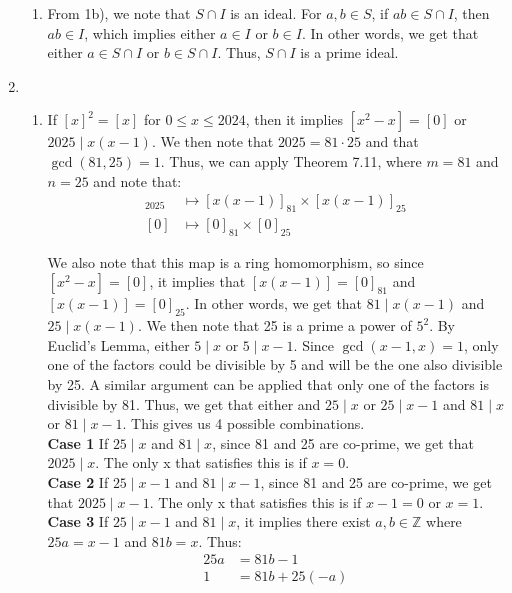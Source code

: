\documentclass{article}
\begin{document}
\begin{enumerate}
\begin{enumerate}
    \item
    From 1b), we note that $S \cap I$ is an ideal. For $a, b \in S$, if $ab \in S \cap I$, then $ab \in I$, which implies either $a \in I$ or $b \in I$. In other words, we get that either $a \in S \cap I$ or $b \in S \cap I$. Thus, $S \cap I$ is a prime ideal.
\end{enumerate}

\newpage 

\item
\begin{enumerate}
    \item 
    If $[x]^2 = [x]$ for $0 \leq x \leq 2024$, then it implies $[x^2 - x] = [0]$ or $2025 \mid x(x-1)$. We then note that $2025 = 81 \cdot 25$ and that $\gcd(81, 25) = 1$. Thus, we can apply Theorem 7.11, where $m = 81$ and $n = 25$ and note that: 
    \begin{align*}
        [x(x-1)]_{2025} &\mapsto [x(x-1)]_{81} \times [x(x-1)]_{25}\\
        [0] &\mapsto [0]_{81} \times [0]_{25}
    \end{align*}

    We also note that this map is a ring homomorphism, so since $[x^2 - x] = [0]$, it implies that $[x(x-1)] = [0]_{81}$ and $[x(x-1)] = [0]_{25}$. In other words, we get that $81 \mid x(x-1)$ and $25 \mid x(x-1)$. We then note that 25 is a prime a power of $5^2$. By Euclid's Lemma, either $5 \mid x$ or $5 \mid x - 1$. Since $\gcd(x - 1, x) = 1$, only one of the factors could be divisible by 5 and will be the one also divisible by 25. A similar argument can be applied that only one of the factors is divisible by 81. Thus, we get that either and $25 \mid x$ or $25 \mid x - 1$ and $81 \mid x$ or $81 \mid x - 1$. This gives us 4 possible combinations. \\

    \textbf{Case 1} If $25 \mid x$ and $81 \mid x$, since 81 and 25 are co-prime, we get that $2025 \mid x$. The only x that satisfies this is if $x = 0$. \\

    \textbf{Case 2} If $25 \mid x-1$ and $81 \mid x-1$, since 81 and 25 are co-prime, we get that $2025 \mid x-1$. The only x that satisfies this is if $x - 1 = 0$ or $x = 1$. \\

    \textbf{Case 3} If $25 \mid x-1$ and $81 \mid x$, it implies there exist $a, b \in \mathbb{Z}$ where $25a = x-1$ and $81b = x$. Thus: 
    \begin{align*}
        25a &= 81b - 1 \\
        1 &= 81b + 25(-a)
    \end{align*}


\end{enumerate}
\end{enumerate}
\end{document}
